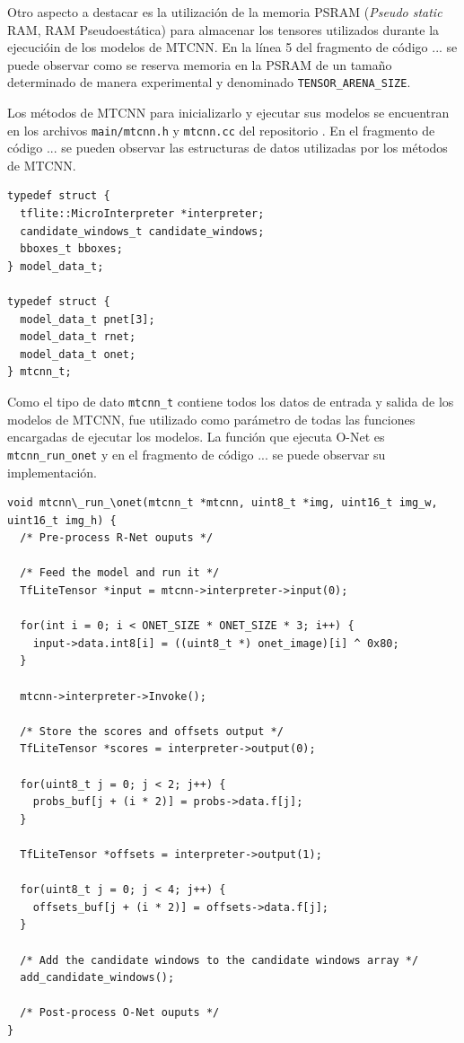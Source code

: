 Otro aspecto a destacar es la utilización de la memoria PSRAM (\textit{Pseudo static} RAM, RAM Pseudoestática) para almacenar los tensores utilizados durante la ejecucióin de los modelos de MTCNN. En la línea 5 del fragmento de código ... se puede observar como se reserva memoria en la PSRAM de un tamaño determinado de manera experimental y denominado \texttt{TENSOR\_ARENA\_SIZE}.

Los métodos de MTCNN para inicializarlo y ejecutar sus modelos se encuentran en los archivos \texttt{main/mtcnn.h} y \texttt{mtcnn.cc} del repositorio \cite{mtcnn_repo}. En el fragmento de código ... se pueden observar las estructuras de datos utilizadas por los métodos de MTCNN.

\begin{lstlisting}[label=cod:mtcnn_struct,caption=Estructura de datos de MTCNN.]
typedef struct {
  tflite::MicroInterpreter *interpreter;
  candidate_windows_t candidate_windows;
  bboxes_t bboxes;
} model_data_t;

typedef struct {
  model_data_t pnet[3];
  model_data_t rnet;
  model_data_t onet;
} mtcnn_t;
\end{lstlisting}

Como el tipo de dato \texttt{mtcnn\_t} contiene todos los datos de entrada y salida de los modelos de MTCNN, fue utilizado como parámetro de todas las funciones encargadas de ejecutar los modelos. La función que ejecuta O-Net es \texttt{mtcnn\_run\_onet} y en el fragmento de código ... se puede observar su implementación.

\begin{lstlisting}[label=cod:mtcnn_struct,caption=Función mtcnn\_run\_onet.]
void mtcnn\_run_\onet(mtcnn_t *mtcnn, uint8_t *img, uint16_t img_w, uint16_t img_h) {
  /* Pre-process R-Net ouputs */
  
  /* Feed the model and run it */
  TfLiteTensor *input = mtcnn->interpreter->input(0);
    
  for(int i = 0; i < ONET_SIZE * ONET_SIZE * 3; i++) {
    input->data.int8[i] = ((uint8_t *) onet_image)[i] ^ 0x80;
  }
  
  mtcnn->interpreter->Invoke();
  
  /* Store the scores and offsets output */
  TfLiteTensor *scores = interpreter->output(0);
  
  for(uint8_t j = 0; j < 2; j++) {
    probs_buf[j + (i * 2)] = probs->data.f[j];
  }

  TfLiteTensor *offsets = interpreter->output(1);

  for(uint8_t j = 0; j < 4; j++) {
    offsets_buf[j + (i * 2)] = offsets->data.f[j];
  }
  
  /* Add the candidate windows to the candidate windows array */
  add_candidate_windows();
  
  /* Post-process O-Net ouputs */
}
\end{lstlisting}

